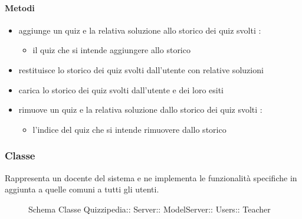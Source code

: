 \paragraph{Metodi}
\begin{itemize}
\item {}
\newline
aggiunge un quiz e la relativa soluzione allo storico dei quiz svolti
\newline
{} :
\begin{itemize}
\item {}
\newline
il quiz che si intende aggiungere allo storico
\end{itemize}
\item {}
\newline
restituisce lo storico dei quiz svolti dall'utente con relative soluzioni
\newline
\item {}
\newline
carica lo storico dei quiz svolti dall'utente e dei loro esiti
\newline
\item {}
\newline
rimuove un quiz e la relativa soluzione dallo storico dei quiz svolti
\newline
{} :
\begin{itemize}
\item {}
\newline
l'indice del quiz che si intende rimuovere dallo storico
\end{itemize}
\end{itemize}
\subsubsection{Classe }
Rappresenta un docente del sistema e ne implementa le funzionalità specifiche in aggiunta a quelle comuni a tutti gli utenti.
\begin{figure}[H]
\centering
\noindent{}
\caption[Schema Classe Teacher]{Schema Classe Quizzipedia:: Server:: ModelServer:: Users:: Teacher}
\end{figure}
